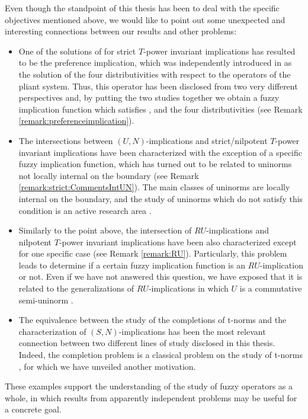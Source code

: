 Even though the standpoint of this thesis has been to deal with the specific objectives mentioned above, we would like to point out some unexpected and interesting connections between our results and other problems:
\begin{itemize}
	\item One of the solutions of \EP for strict $T$-power invariant implications has resulted to be the preference implication, which was independently introduced in \cite{Baczynski2020B} as the solution of the four distributivities with respect to the operators of the pliant system. Thus, this operator has been disclosed from two very different perspectives and, by putting the two studies together we obtain a fuzzy implication function which satisfies \PIT, \EP and the four distributivities (see Remark \ref{remark:preferenceimplication}).
	\item The intersections between $(U,N)$-implications and strict/nilpotent $T$-power invariant implications have been characterized with the exception of a specific fuzzy implication function, which has turned out to be related to uninorms not locally internal on the boundary (see Remark \ref{remark:strict:CommentsIntUN}). The main classes of uninorms are locally internal on the boundary, and the study of uninorms which do not satisfy this condition is an active research area \cite{Xie2022}.
	\item Similarly to the point above, the intersection of $RU$-implications and nilpotent $T$-power invariant implications have been also characterized except for one specific case (see Remark \ref{remark:RU}). Particularly, this problem leads to determine if a certain fuzzy implication function is an $RU$-implication or not. Even if we have not answered this question, we have exposed that it is related to the generalizations of $RU$-implications in which $U$ is a commutative semi-uninorm \cite{Krol2011,Ouyang2012}.
	\item The equivalence between the study of the completions of t-norms and the characterization of $(S,N)$-implications has been the most relevant connection between two different lines of study disclosed in this thesis.  Indeed, the completion problem is a classical problem on the study of t-norms \cite{Kimberling1973,Darsow1983,Bezivin1993}, for which we have unveiled another motivation. 
\end{itemize}
These examples support the understanding of the study of fuzzy operators as a whole, in which results from apparently independent problems may be useful for a concrete goal.


